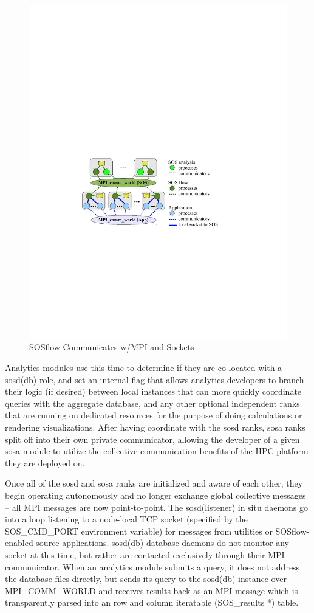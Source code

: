\begin{figure}[!t]
  \centering
  \includegraphics[width=5in]{images/sos-mpmd.pdf}
  \caption{SOSflow Communicates w/MPI and Sockets}
  \label{fig_sim}
\end{figure}

Analytics modules use this time to determine if they are co-located
with a sosd(db) role, and set an internal flag that allows analytics
developers to branch their logic (if desired) between local instances that
can more quickly coordinate queries with the aggregate database, and any 
other optional independent ranks that are running on dedicated resources
for the purpose of doing calculations or rendering visualizations.
%
After having coordinate with the sosd ranks, sosa ranks split off into
their own private communicator, allowing the developer of a given sosa
module to utilize the collective communication benefits of the HPC
platform they are deployed on.

Once all of the sosd and sosa ranks are initialized and aware of each
other, they begin operating autonomously and no longer exchange global
collective messages -- all MPI messages are now point-to-point.
%
The sosd(listener) in situ daemons go into a loop listening to a
node-local TCP socket (specified by the SOS\_CMD\_PORT environment
variable) for messages from utilities or SOSflow-enabled source
applications.
%
sosd(db) database daemons do not monitor any socket at this time, but
rather are contacted exclusively through their MPI communicator.
%
When an analytics module submits a query, it does not address the
database files directly, but sends its query to the sosd(db) instance
over MPI\_COMM\_WORLD and receives results back as an MPI message
which is transparently parsed into an row and column iteratable
(SOS\_results *) table.

